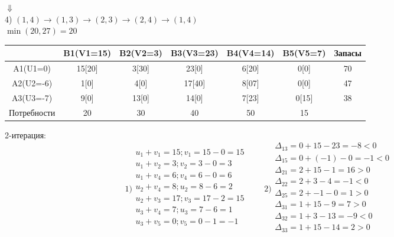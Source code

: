 \documentclass[a4paper, 12pt]{article}
\begin{document}
\begin{center}
  $\Downarrow$\\
  4) $(1,4)\rightarrow(1,3)\rightarrow(2,3)\rightarrow(2,4)\rightarrow(1,4)$\\
  $\min(20,27) = 20$
\end{center}
\begin{table}[H]
\centering
\begin{tabular}{|c|c|c|c|c|c|c|}
\hline
            & B1(V1=15)& B2(V2=3) & B3(V3=23) & B4(V4=14) & B5(V5=7)  & Запасы \\ \hline
A1(U1=0)    & 15[20]   & 3[30]    & 23[0]     & 6[20]     & 0[0]      & 70     \\ \hline
A2(U2=-6)   & 1[0]     & 4[0]     & 17[40]    & 8[07]     & 0[0]      & 47     \\ \hline
A3(U3=-7)   & 9[0]     & 13[0]    & 14[0]     & 7[23]     & 0[15]     & 38     \\ \hline
Потребности & 20       & 30       & 40        & 50        & 15        &        \\ \hline
\end{tabular}
\end{table}

2-итерация:\\
\begin{equation*}
  1)\begin{split}
    u_1 + v_1 = 15; v_1 = 15-0 = 15\\
    u_1 + v_2 = 3; v_2 = 3-0 = 3\\
    u_1 + v_4 = 6; v_4 = 6-0 = 6\\
    u_2 + v_4 = 8; u_2 = 8-6 = 2\\
    u_2 + v_3 = 17; v_3 = 17-2 = 15\\
    u_3 + v_4 = 7; u_3 = 7-6 = 1\\
    u_3 + v_5 = 0; v_5 = 0-1 = -1\\
  \end{split}
  \qquad  
  2)\begin{split}
    \Delta_{13} = 0 + 15 - 23 = -8 < 0 \\
    \Delta_{15} = 0 + (-1) - 0 = -1 < 0 \\
    \Delta_{21} = 2 + 15 - 1 = 16 > 0 \\
    \Delta_{22} = 2 + 3 - 4 = -1 < 0 \\
    \Delta_{25} = 2 + -1 - 0 = 1 > 0 \\
    \Delta_{31} = 1 + 15 - 9 = 7 > 0 \\
    \Delta_{32} = 1 + 3 - 13 = -9 < 0 \\
    \Delta_{33} = 1 + 15 - 14 = 2 > 0 \\
  \end{split}
\end{equation*}
\end{document}
